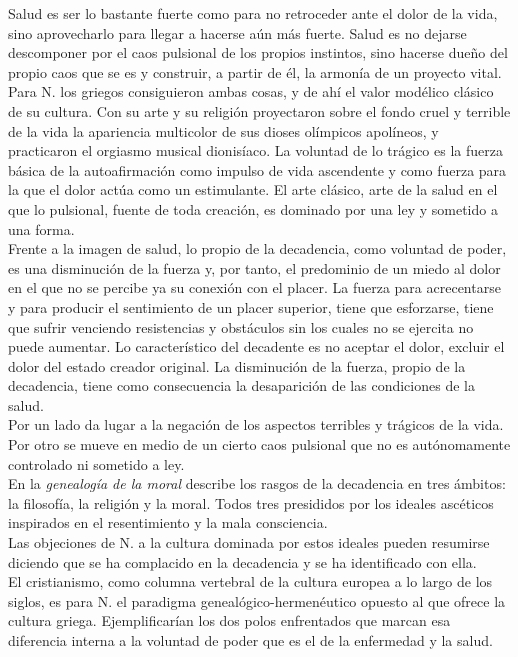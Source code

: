 \documentclass[a4paper, 10pt, twocolumn, spanish]{article}
\begin{document}
Salud es ser lo bastante fuerte como para no retroceder ante el dolor
de la vida, sino aprovecharlo para llegar a hacerse aún más
fuerte. Salud es no dejarse descomponer por el caos pulsional de los
propios instintos, sino hacerse dueño del propio caos que se es y
construir, a partir de él, la armonía de un proyecto vital.\\[0pt]
Para N. los griegos consiguieron ambas cosas, y de ahí el valor
modélico clásico de su cultura. Con su arte y su religión proyectaron
sobre el fondo cruel y terrible de la vida la apariencia multicolor de
sus dioses olímpicos apolíneos, y practicaron el orgiasmo musical
dionisíaco. La voluntad de lo trágico es la fuerza básica de la
autoafirmación como impulso de vida ascendente y como fuerza para la
que el dolor actúa como un estimulante. El arte clásico, arte de la
salud en el que lo pulsional, fuente de toda creación, es dominado por
una ley y sometido a una forma.\\[0pt]

Frente a la imagen de salud, lo propio de la decadencia, como voluntad
de poder, es una disminución de la fuerza y, por tanto, el predominio
de un miedo al dolor en el que no se percibe ya su conexión con el
placer. La fuerza para acrecentarse y para producir el sentimiento de
un placer superior, tiene que esforzarse, tiene que sufrir venciendo
resistencias y obstáculos sin los cuales no se ejercita no puede
aumentar. Lo característico del decadente es no aceptar el dolor,
excluir el dolor del estado creador original. La disminución de la
fuerza, propio de la decadencia, tiene como consecuencia la
desaparición de las condiciones de la salud.\\[0pt]
Por un lado da lugar a la negación de los aspectos terribles y
trágicos de la vida. Por otro se mueve en medio de un cierto caos
pulsional que no es autónomamente controlado ni sometido a ley.\\[0pt]

En la \emph{genealogía de la moral} describe los rasgos de la decadencia en
tres ámbitos: la filosofía, la religión y la moral. Todos tres
presididos por los ideales ascéticos inspirados en el resentimiento y
la mala consciencia.\\[0pt]
Las objeciones de N. a la cultura dominada por estos ideales pueden
resumirse diciendo que se ha complacido en la decadencia y se ha
identificado con ella.\\[0pt]

El cristianismo, como columna vertebral de la cultura europea a lo
largo de los siglos, es para N. el paradigma genealógico-hermenéutico
opuesto al que ofrece la cultura griega. Ejemplificarían los dos polos
enfrentados que marcan esa diferencia interna a la voluntad de poder
que es el de la enfermedad y la salud.\\[0pt]
\end{document}
